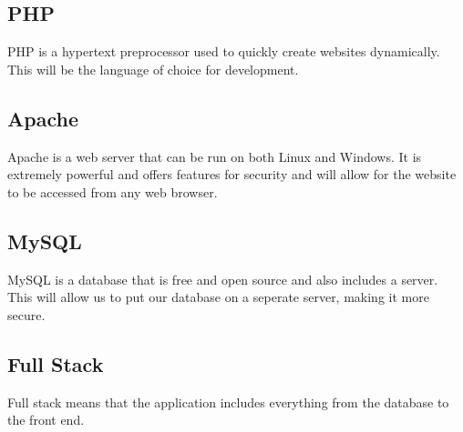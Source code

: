 \documentclass[12pt]{article}
\begin{document}
        \subsection{PHP}
                PHP is a hypertext preprocessor used to quickly create websites
                dynamically. This will be the language of choice for development.

        \subsection{Apache}
                Apache is a web server that can be run on both Linux and Windows.
                It is extremely powerful and offers features for security and will
                allow for the website to be accessed from any web browser.

        \subsection{MySQL}
                MySQL is a database that is free and open source and also includes
                a server. This will allow us to put our database on a seperate 
                server, making it more secure.

        \subsection{Full Stack}
                Full stack means that the application includes everything from
                the database to the front end.
\end{document}
